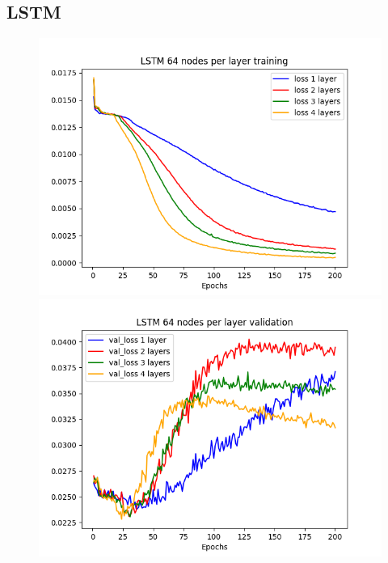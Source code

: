 \documentclass[11pt]
{article}
\begin{document}
\subsection{LSTM}
\begin{figure}[ht] 
	\hspace*{-2cm}  
	\begin{minipage}[b]{0.33\linewidth}
		\centering
		\includegraphics[width=\linewidth]{../TESTS_RESULTS/LSTM_tests/plots/64_training.png} 
	\end{minipage}%
	\begin{minipage}[b]{0.33\linewidth}
		\centering
		\includegraphics[width=\linewidth]{../TESTS_RESULTS/LSTM_tests/plots/64_validation.png} 
	\end{minipage} 

\end{figure}
\end{document}
